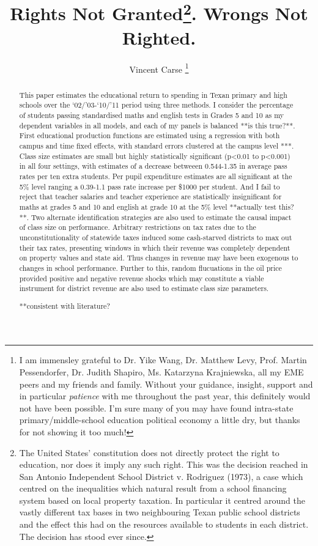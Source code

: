 \documentclass[titlepage]{article}
\begin{document}
\title{Rights Not Granted\footnote{The United States' constitution does not directly protect the right to education, nor does it imply any such right. This was the decision reached in San Antonio Independent School District v. Rodriguez (1973), a case which centred on the inequalities which natural result from a school financing system based on local property taxation. In particular it centred around the vastly different tax bases in two neighbouring Texan public school districts and the effect this had on the resources available to students in each district. The decision has stood ever since.
}. Wrongs Not Righted.}
\author{Vincent Carse \thanks{I am immensley grateful to Dr. Yike Wang, Dr. Matthew Levy, Prof. Martin Pessendorfer, Dr. Judith Shapiro, Ms. Katarzyna Krajniewska, all my EME peers and my friends and family. Without your guidance, insight, support and in particular \textit{patience} with me throughout the past year, this definitely would not have been possible. I'm sure many of you may have found intra-state primary/middle-school education political economy a little dry, but thanks for not showing it too much!}}
\maketitle
\begin{abstract}

This paper estimates the educational return to spending in Texan primary and high schools over the ‘02/’03-‘10/’11 period using three methods. I consider the percentage of students passing standardised maths and english tests in Grades 5 and 10 as my dependent variables in all models, and each of my panels is balanced **is this true?**. First educational production functions are estimated using a regression with both campus and time fixed effects, with standard errors clustered at the campus level ***. Class size estimates are small but highly statistically significant (p\textless{0.01} to p\textless{0.001}) in all four settings, with estimates of a decrease betweeen 0.544-1.35 in average pass rates per ten extra students. Per pupil expenditure estimates are all significant at the 5\% level ranging a 0.39-1.1 pass rate increase per \$1000 per student. And I fail to reject that teacher salaries and teacher experience are statistically insignificant for maths at grades 5 and 10 and english at grade 10 at the 5\% level **actually test this?**. Two alternate identification strategies are also used to estimate the causal impact of class size on performance. Arbitrary restrictions on tax rates due to the unconstitutionality of statewide taxes induced some cash-starved districts to max out their tax rates, presenting windows in which their revenue was completely dependent on property values and state aid. Thus changes in revenue may have been exogenous to changes in school performance. Further to this, random flucuations in the oil price provided positive and negative revenue shocks which may constitute a viable instrument for district revenue are also used to estimate class size parameters.

**consistent with literature?



\end{abstract}
\end{document}
